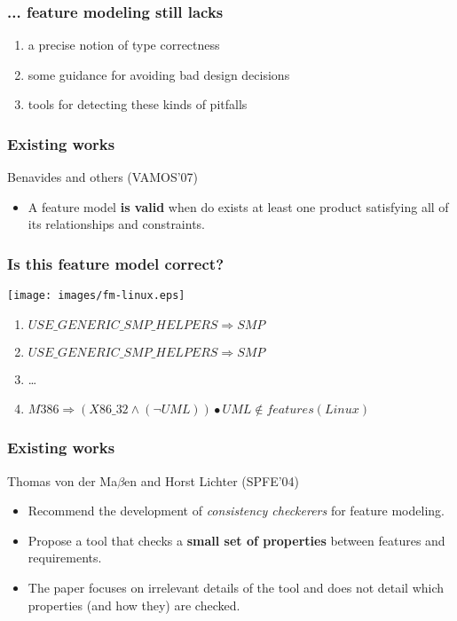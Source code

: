 \documentclass{beamer}
\begin{document}
\begin{frame}

\frametitle{... feature modeling still lacks}

\begin{enumerate}
\item a precise notion of type correctness
\item some guidance for avoiding bad design decisions
\item tools for detecting these kinds of pitfalls 
\end{enumerate}

\end{frame}

\begin{frame}

\frametitle{Existing works}

Benavides and others (VAMOS'07)
\begin{itemize}
\item A feature model {\bf is valid} when do exists at least one product satisfying all 
of its relationships and constraints.  
\end{itemize}

\end{frame}

\begin{frame}

\frametitle{Is this feature model correct?}

\begin{center}
  \texttt{[image: images/fm-linux.eps]} 
\end{center}
\begin{small}
\begin{enumerate}
\item $USE\_GENERIC\_SMP\_HELPERS \Rightarrow SMP$
\item $USE\_GENERIC\_SMP\_HELPERS \Rightarrow SMP$
\item \ldots
\item $M386 \Rightarrow (X86\_32 \land (\lnot UML)) \bullet UML \notin features (Linux) $
\end{enumerate}
\end{small}
\end{frame}

\begin{frame}

\frametitle{Existing works}

Thomas von der Ma$\beta$en and Horst Lichter (SPFE'04)

\begin{itemize}
\item Recommend the development of \emph{consistency checkerers} for feature modeling.   
\item Propose a tool that checks a {\bf small set of properties} between features and requirements.
\item The paper focuses on irrelevant details of the tool and does not detail which properties (and how they) are checked.
\end{itemize}

\end{frame}
\end{document}
